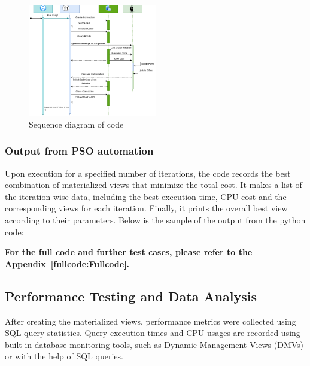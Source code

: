\clearpage




\begin{figure}[h]
    \centering
    \includegraphics[width=0.5\textwidth]{Figure/seq.diagram .png} %
    \caption{Sequence diagram of code}
    \label{fig:sample_image}
\end{figure}






\subsubsection{Output from PSO automation }  Upon execution for a specified number of iterations, the code records the best combination of materialized views that minimize the total cost. It makes a list of the iteration-wise data, including the best execution time, CPU cost and the corresponding views for each iteration. Finally, it prints the overall best view according to their parameters. Below is the sample of the output from the python code: \vspace{.4cm}



   \vspace{.4cm}
  


  

\textbf{For the full code and further test cases, please refer to the Appendix~\ref{fullcode:Fullcode}.}


\subsection{Performance Testing and Data Analysis} After creating the materialized views, performance metrics were collected using SQL query statistics. Query execution times and CPU usages are recorded using built-in database monitoring tools, such as Dynamic Management Views (DMVs) or with the help of SQL queries. \vspace{.4cm}


